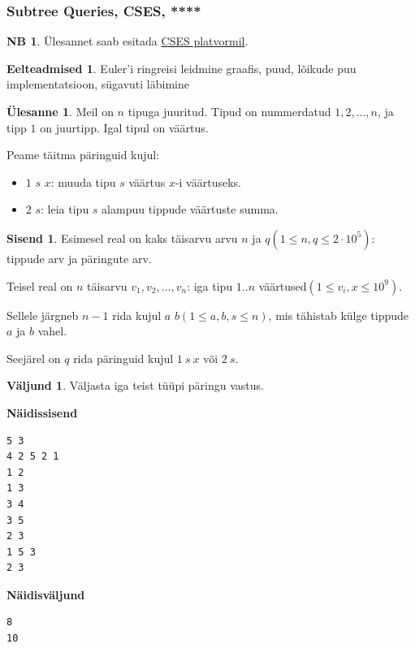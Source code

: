 \documentclass{trkut}
\theoremstyle{definition}
\newtheorem*{prereq}{Eelteadmised}
\newtheorem*{extra}{NB}
\newtheorem*{Input}{Sisend}
\newtheorem*{Output}{Väljund}
\newtheorem*{Text}{Ülesanne}
\begin{document}
\subsubsection{Subtree Queries, CSES, ****}
\begin{extra}
Ülesannet saab esitada \href{https://cses.fi/problemset/task/1137}{CSES platvormil}.
\end{extra}
\begin{prereq} 
Euler'i ringreisi leidmine graafis, puud, lõikude puu implementatsioon, sügavuti läbimine
\end{prereq}
\begin{Text}
Meil on $n$ tipuga juuritud. Tipud on nummerdatud $1,2,...,n$, ja tipp $1$ on juurtipp. Igal tipul on väärtus. 

Peame täitma päringuid kujul:
\begin{itemize}
\item $1$ $s$ $x$: muuda tipu $s$ väärtus $x$-i väärtuseks. 
\item $2$ $s$: leia tipu $s$ alampuu tippude väärtuste summa.
\end{itemize}

\parencite{13}
\end{Text}
\begin{Input}
Esimesel real on kaks täisarvu arvu $n$ ja $q$$(1\le n,q\le 2\cdot10^5)$: tippude arv ja päringute arv.

Teisel real on $n$ täisarvu $v_1,v_2,...,v_n$: iga tipu $1..n$ väärtused$(1\le v_i,x\le 10^9)$.

Sellele järgneb $n-1$ rida kujul $a$ $b$$(1\le a,b,s\le n)$, mis tähistab külge tippude $a$ ja $b$ vahel.

Seejärel on $q$ rida päringuid kujul $1\ s\ x$ või $2\ s$.
\end{Input}
\begin{Output}
Väljasta iga teist tüüpi päringu vastus.
\end{Output}

\textbf{Näidissisend}

\begin{verbatim}
5 3
4 2 5 2 1
1 2
1 3
3 4
3 5
2 3
1 5 3
2 3
\end{verbatim}

\textbf{Näidisväljund}

\begin{verbatim}
8
10
\end{verbatim}
\end{document}
